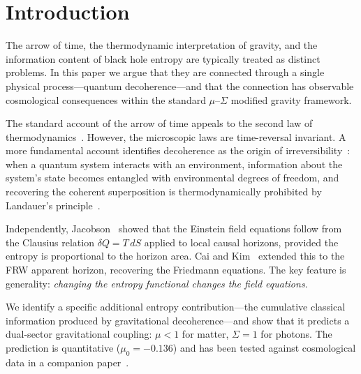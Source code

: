 \documentclass[11pt]{article}
\begin{document}
\section{Introduction}
\label{sec:intro}

The arrow of time, the thermodynamic interpretation of gravity, and the
information content of black hole entropy are typically treated as distinct
problems.  In this paper we argue that they are connected through a single
physical process---quantum decoherence---and that the connection has
observable cosmological consequences within the standard $\mu$--$\Sigma$
modified gravity framework.

The standard account of the arrow of time appeals to the second law of
thermodynamics~\citep{Penrose1989}.  However, the microscopic laws are
time-reversal invariant.  A more fundamental account identifies decoherence
as the origin of irreversibility~\citep{Zurek2003,Schlosshauer2007}: when
a quantum system interacts with an environment, information about the
system's state becomes entangled with environmental degrees of freedom,
and recovering the coherent superposition is thermodynamically prohibited
by Landauer's principle~\citep{Landauer1961}.

Independently, Jacobson~\citep{Jacobson1995} showed that the Einstein
field equations follow from the Clausius relation $\delta Q = T\,dS$
applied to local causal horizons, provided the entropy is proportional to
the horizon area.  Cai and Kim~\citep{CaiKim2005} extended this to the FRW
apparent horizon, recovering the Friedmann equations.  The key feature is
generality: \emph{changing the entropy functional changes the field
equations}.

We identify a specific additional entropy contribution---the cumulative
classical information produced by gravitational decoherence---and show that
it predicts a dual-sector gravitational coupling: $\mu < 1$ for matter,
$\Sigma = 1$ for photons.  The prediction is quantitative ($\mu_0 = -0.136$)
and has been tested against cosmological data in a companion
paper~\citep{Mahaffey2026obs}.
\end{document}
